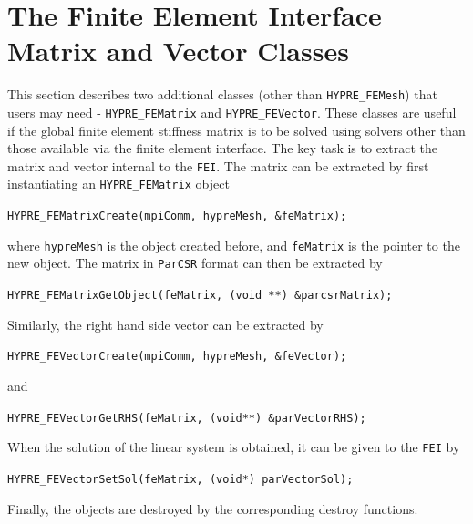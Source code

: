 \section{The Finite Element Interface Matrix and Vector Classes}

This section describes two additional classes (other than {\tt HYPRE\_FEMesh})
that users may need - {\tt HYPRE\_FEMatrix} and {\tt HYPRE\_FEVector}. 
These classes are useful if the global finite element stiffness matrix is
to be solved using solvers other than those available via the finite element
interface. The key task is to extract
the matrix and vector internal to the {\tt FEI}. The matrix can be extracted
by first instantiating an {\tt HYPRE\_FEMatrix} object
\begin{tabbing}
\hspace{0.5in} \= {\tt HYPRE\_FEMatrixCreate(mpiComm, hypreMesh, \&feMatrix);}
\end{tabbing}
where {\tt hypreMesh} is the object created before, and {\tt feMatrix} is 
the pointer to the new object.
The \hypre{} matrix in {\tt ParCSR} format can then be extracted by
\begin{tabbing}
\hspace{0.5in} \= {\tt HYPRE\_FEMatrixGetObject(feMatrix, (void **) \&parcsrMatrix);}
\end{tabbing}
Similarly, the right hand side vector can be extracted by
\begin{tabbing}
\hspace{0.5in} \= {\tt HYPRE\_FEVectorCreate(mpiComm, hypreMesh, \&feVector);}
\end{tabbing}
and
\begin{tabbing}
\hspace{0.5in} \= {\tt HYPRE\_FEVectorGetRHS(feMatrix, (void**) \&parVectorRHS);}
\end{tabbing}
When the solution of the linear system is obtained, it can be given
to the {\tt FEI} by
\begin{tabbing}
\hspace{0.5in} \= {\tt HYPRE\_FEVectorSetSol(feMatrix, (void*) parVectorSol);}
\end{tabbing}
Finally, the objects are destroyed by the corresponding destroy functions.


